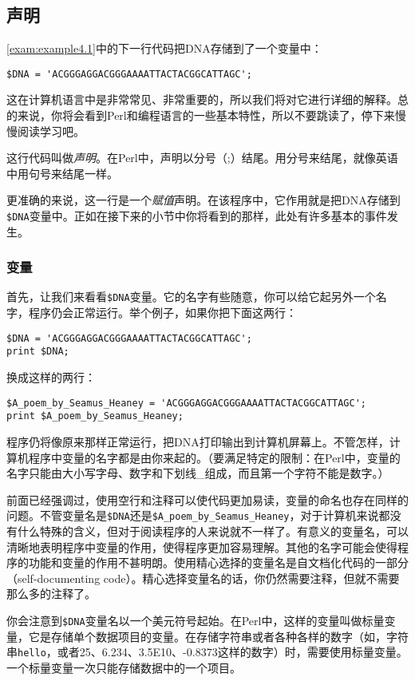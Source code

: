 \subsection{声明}
\autoref{exam:example4.1}中的下一行代码把DNA存储到了一个变量中：

\begin{lstlisting}
$DNA = 'ACGGGAGGACGGGAAAATTACTACGGCATTAGC';
\end{lstlisting}

这在计算机语言中是非常常见、非常重要的，所以我们将对它进行详细的解释。总的来说，你将会看到Perl和编程语言的一些基本特性，所以不要跳读了，停下来慢慢阅读学习吧。

这行代码叫做\textit{声明}。在Perl中，声明以分号（;）结尾。用分号来结尾，就像英语中用句号来结尾一样。

更准确的来说，这一行是一个\textit{赋值}声明。在该程序中，它作用就是把DNA存储到\verb|$DNA|变量中。正如在接下来的小节中你将看到的那样，此处有许多基本的事件发生。

\subsubsection{变量}
首先，让我们来看看\verb|$DNA|变量。它的名字有些随意，你可以给它起另外一个名字，程序仍会正常运行。举个例子，如果你把下面这两行：

\begin{lstlisting}
$DNA = 'ACGGGAGGACGGGAAAATTACTACGGCATTAGC';
print $DNA;
\end{lstlisting}
换成这样的两行：

\begin{lstlisting}
$A_poem_by_Seamus_Heaney = 'ACGGGAGGACGGGAAAATTACTACGGCATTAGC';
print $A_poem_by_Seamus_Heaney;
\end{lstlisting}
程序仍将像原来那样正常运行，把DNA打印输出到计算机屏幕上。不管怎样，计算机程序中变量的名字都是由你来起的。（要满足特定的限制：在Perl中，变量的名字只能由大小写字母、数字和下划线\_组成，而且第一个字符不能是数字。）

前面已经强调过，使用空行和注释可以使代码更加易读，变量的命名也存在同样的问题。不管变量名是\verb|$DNA|还是\verb|$A_poem_by_Seamus_Heaney|，对于计算机来说都没有什么特殊的含义，但对于阅读程序的人来说就不一样了。有意义的变量名，可以清晰地表明程序中变量的作用，使得程序更加容易理解。其他的名字可能会使得程序的功能和变量的作用不甚明朗。使用精心选择的变量名是自文档化代码的一部分（self-documenting code）。精心选择变量名的话，你仍然需要注释，但就不需要那么多的注释了。

你会注意到\verb|$DNA|变量名以一个美元符号起始。在Perl中，这样的变量叫做标量变量，它是存储单个数据项目的变量。在存储字符串或者各种各样的数字（如，字符串\verb|hello|，或者25、6.234、3.5E10、-0.8373这样的数字）时，需要使用标量变量。一个标量变量一次只能存储数据中的一个项目。

